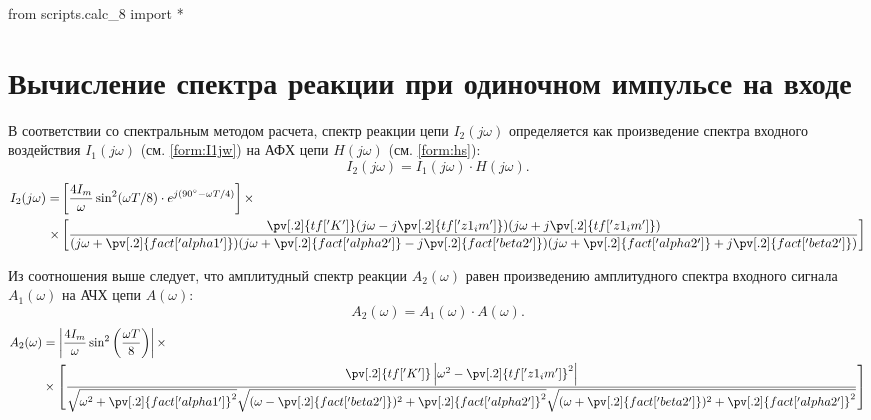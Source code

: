 \begin{python}
from scripts.calc_8 import *
\end{python}

\section{Вычисление спектра реакции при одиночном импульсе на входе}
\label{sec:spectr_reaction_odin}

В соответствии со спектральным методом расчета, спектр реакции цепи ${I}_2(j\omega)$ определяется как произведение спектра входного воздействия ${I}_1(j\omega)$ (см. \cref{form:I1jw}) на АФХ цепи ${H}(j\omega)$ (см. \cref{form:hs}):
\begin{equation}
    {I}_2(j\omega) = {I}_1(j\omega) \cdot {H}(j\omega).
    \label{form:I2spectr}
\end{equation}
\begin{equation}
    \begin{aligned}
        {I}_2(j\omega) = 
        &\left[
            \frac{4I_m}{\omega} \sin^2(\omega T / 8) 
            \cdot 
            e^{j(90^\circ - \omega T/4)}
        \right]
        \times \\ \times
        &\left[
            \frac{
                \pv[.2]{tf['K']}
                (j\omega - j\pv[.2]{tf['z1_im']})
                (j\omega + j\pv[.2]{tf['z1_im']})
            }{
                (j\omega + \pv[.2]{fact['alpha1']})
                (j\omega + \pv[.2]{fact['alpha2']} - j\pv[.2]{fact['beta2']})
                (j\omega + \pv[.2]{fact['alpha2']} + j\pv[.2]{fact['beta2']})
            }
        \right]
    \end{aligned}
\end{equation}

Из соотношения выше следует, что амплитудный спектр реакции $A_2(\omega)$ равен произведению амплитудного спектра входного сигнала $A_1(\omega)$ на АЧХ цепи $A(\omega)$:
\begin{equation}
    A_2(\omega) = A_1(\omega) \cdot A(\omega).
\end{equation}
\begin{equation}
    \begin{aligned}
        A_2(\omega) &= 
        \left|
            \frac{4I_m}{\omega} \sin^2\left(
                \frac{\omega T}{8
            }\right)
        \right|
        \times \\ &\times
        \left[
            \frac{
                \pv[.2]{tf['K']}
                \left|\omega^2 - \pv[.2]{tf['z1_im']}^2\right|
            }{
                \sqrt{
                    \omega^2 + 
                    \pv[.2]{fact['alpha1']}^2
                }
                \sqrt{
                    (\omega - \pv[.2]{fact['beta2']})^2 + 
                    \pv[.2]{fact['alpha2']}^2
                }
                \sqrt{
                    (\omega + \pv[.2]{fact['beta2']})^2 + 
                    \pv[.2]{fact['alpha2']}^2
                }
            }
        \right]
    \end{aligned}
    \label{form:A2w}
\end{equation}

